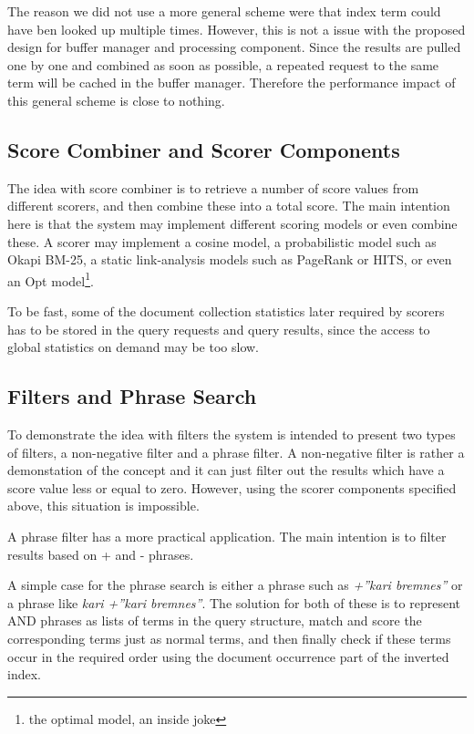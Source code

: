 The reason we did not use a more general scheme were that index term could have ben looked up multiple times. However, this is not a issue with the proposed design for buffer manager and processing component. Since the results are pulled one by one and combined as soon as possible, a repeated request to the same term will be cached in the buffer manager. Therefore the performance impact of this general scheme is close to nothing. 

\subsection{Score Combiner and Scorer Components}
The idea with score combiner is to retrieve a number of score values from different scorers, and then combine these into a total score. The main intention here is that the system may implement different scoring models or even combine these. A scorer may implement a cosine model, a probabilistic model such as Okapi BM-25, a static link-analysis models such as PageRank or HITS, or even an Opt model\footnote{the optimal model, an inside joke}.

To be fast, some of the document collection statistics later required by scorers has to be stored in the query requests and query results, since the access to global statistics on demand may be too slow. 

\subsection{Filters and Phrase Search}
To demonstrate the idea with filters the system is intended to present two types of filters, a non-negative filter and a phrase filter. A non-negative filter is rather a demonstation of the concept and it can just filter out the results which have a score value less or equal to zero. However, using the scorer components specified above, this situation is impossible.

A phrase filter has a more practical application. The main intention is to filter results based on + and - phrases.

A simple case for the phrase search is either a phrase such as {\it +''kari bremnes''} or a phrase like {\it kari +''kari bremnes''}. The solution for both of these is to represent AND phrases as lists of terms in the query structure, match and score the corresponding terms just as normal terms, and then finally check if these terms occur in the required order using the document occurrence part of the inverted index.


